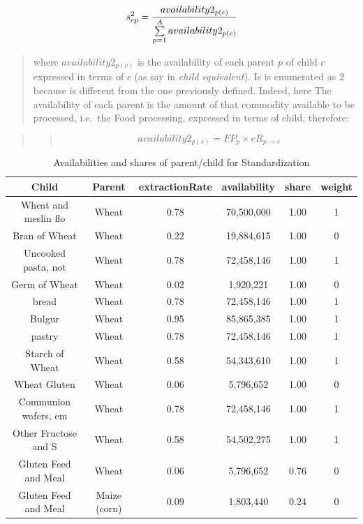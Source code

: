 \documentclass[]{article}
\begin{document}
\begin{equation}
\label{eq:shares}
s^{2}_{cp} = \cfrac{availability2_{p(c)}}{\sum \limits_{p=1}^A{availability2_{p(c)}}}
\end{equation}

\begin{quote}
where \(availability2_{p(c)}\) is the availability of each parent \(p\)
of child \(c\) expressed in terms of \(c\) (as say in \emph{child
equivalent}). Is is enumerated as \(2\) because is different from the
one previously defined. Indeed, here The availability of each parent is
the amount of that commodity available to be processed, i.e.~the Food
processing, expressed in terms of child, therefore:
\end{quote}

\begin{quote}
\begin{quote}
\begin{equation}
\label{eq:availability2}
availability2_{p(c)} = FP_{p}\times eR_{p\to c}
\end{equation}
\end{quote}
\end{quote}

\begin{table}

\caption{\label{tab:t17}Availabilities and shares of parent/child for Standardization}
\centering
\begin{tabular}[t]{c|c|c|c|c|c}
\hline
Child & Parent & extractionRate & availability & share & weight\\
\hline
Wheat and meslin flo & Wheat & 0.78 & 70,500,000 & 1.00 & 1\\
\hline
Bran of Wheat & Wheat & 0.22 & 19,884,615 & 1.00 & 0\\
\hline
Uncooked pasta, not & Wheat & 0.78 & 72,458,146 & 1.00 & 1\\
\hline
Germ of Wheat & Wheat & 0.02 & 1,920,221 & 1.00 & 0\\
\hline
bread & Wheat & 0.78 & 72,458,146 & 1.00 & 1\\
\hline
Bulgur & Wheat & 0.95 & 85,865,385 & 1.00 & 1\\
\hline
pastry & Wheat & 0.78 & 72,458,146 & 1.00 & 1\\
\hline
Starch of Wheat & Wheat & 0.58 & 54,343,610 & 1.00 & 1\\
\hline
Wheat Gluten & Wheat & 0.06 & 5,796,652 & 1.00 & 0\\
\hline
Communion wafers, em & Wheat & 0.78 & 72,458,146 & 1.00 & 1\\
\hline
Other Fructose and S & Wheat & 0.58 & 54,502,275 & 1.00 & 1\\
\hline
Gluten Feed and Meal & Wheat & 0.06 & 5,796,652 & 0.76 & 0\\
\hline
Gluten Feed and Meal & Maize (corn) & 0.09 & 1,803,440 & 0.24 & 0\\
\hline
\end{tabular}
\end{table}
\end{document}
